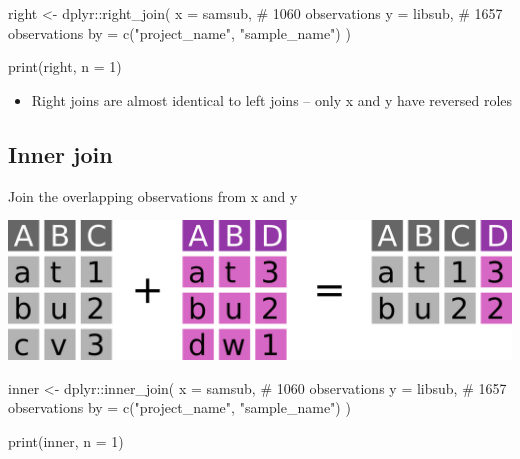 \documentclass[
  letterpaper,
]{book}
\newenvironment{Shaded}{}{}
\newcommand{\AttributeTok}[1]{\textcolor[rgb]{0.84,0.23,0.29}{#1}}
\newcommand{\CommentTok}[1]{\textcolor[rgb]{0.42,0.45,0.49}{#1}}
\newcommand{\DecValTok}[1]{\textcolor[rgb]{0.00,0.36,0.77}{#1}}
\newcommand{\FunctionTok}[1]{\textcolor[rgb]{0.44,0.26,0.76}{#1}}
\newcommand{\NormalTok}[1]{\textcolor[rgb]{0.14,0.16,0.18}{#1}}
\newcommand{\OtherTok}[1]{\textcolor[rgb]{0.44,0.26,0.76}{#1}}
\newcommand{\SpecialCharTok}[1]{\textcolor[rgb]{0.00,0.36,0.77}{#1}}
\newcommand{\StringTok}[1]{\textcolor[rgb]{0.01,0.18,0.38}{#1}}
\providecommand{\tightlist}{%
  \setlength{\itemsep}{0pt}\setlength{\parskip}{0pt}}\usepackage{longtable,booktabs,array}
\begin{document}
\begin{Shaded}
\begin{Highlighting}[]
\NormalTok{right }\OtherTok{\textless{}{-}}\NormalTok{ dplyr}\SpecialCharTok{::}\FunctionTok{right\_join}\NormalTok{(}
  \AttributeTok{x =}\NormalTok{ samsub,                           }\CommentTok{\# 1060 observations}
  \AttributeTok{y =}\NormalTok{ libsub,                           }\CommentTok{\# 1657 observations}
  \AttributeTok{by =} \FunctionTok{c}\NormalTok{(}\StringTok{"project\_name"}\NormalTok{, }\StringTok{"sample\_name"}\NormalTok{)}
\NormalTok{)}

\FunctionTok{print}\NormalTok{(right, }\AttributeTok{n =} \DecValTok{1}\NormalTok{)}
\end{Highlighting}
\end{Shaded}

\begin{itemize}
\tightlist
\item
  Right joins are almost identical to left joins -- only x and y have
  reversed roles
\end{itemize}

\hypertarget{inner-join}{%
\subsection{Inner join}\label{inner-join}}

Join the overlapping observations from x and y

\includegraphics{assets/images/chapters/introduction-to-r/inner_join.png}

\begin{Shaded}
\begin{Highlighting}[]
\NormalTok{inner }\OtherTok{\textless{}{-}}\NormalTok{ dplyr}\SpecialCharTok{::}\FunctionTok{inner\_join}\NormalTok{(}
\AttributeTok{x =}\NormalTok{ samsub,                           }\CommentTok{\# 1060 observations}
\AttributeTok{y =}\NormalTok{ libsub,                           }\CommentTok{\# 1657 observations}
\AttributeTok{by =} \FunctionTok{c}\NormalTok{(}\StringTok{"project\_name"}\NormalTok{, }\StringTok{"sample\_name"}\NormalTok{)}
\NormalTok{)}

\FunctionTok{print}\NormalTok{(inner, }\AttributeTok{n =} \DecValTok{1}\NormalTok{)}
\end{Highlighting}
\end{Shaded}
\end{document}
